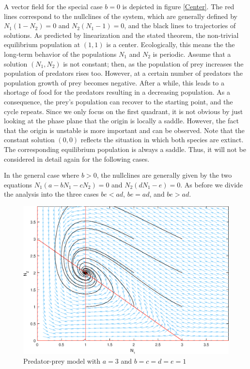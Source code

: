 \documentclass[11pt,a4paper]{scrartcl}
\theoremstyle{definition}
\begin{document}
A vector field for the special case $b=0$ is depicted in figure \ref{Center}. The red lines correspond to the nullclines of the system, which are generally defined by $N_1(1-N_2)=0$ and $N_2(N_1-1)=0$, and the black lines to trajectories of solutions. As predicted by linearization and the stated theorem, the non-trivial equilibrium population at $(1,1)$ is a center. Ecologically, this means the the long-term behavior of the populations $N_1$ and $N_2$ is periodic. Assume that a solution $(N_1,N_2)$ is not constant; then, as the population of prey increases the population of predators rises too. However, at a certain number of predators the population growth of prey becomes negative. After a while, this leads to a shortage of food for the predators resulting in a decreasing population. As a consequence, the prey's population can recover to the starting point, and the cycle repeats. Since we only focus on the first quadrant, it is not obvious by just looking at the phase plane that the origin is locally a saddle. However, the fact that the origin is unstable is more important and can be observed. Note that the constant solution $(0,0)$ reflects the situation in which both species are extinct. The corresponding equilibrium population is always a saddle. Thus, it will not be considered in detail again for the following cases. 
\newline

In the general case where $b>0$, the nullclines are generally given by the two equations $N_1(a-bN_1-cN_2)=0$ and $N_2(dN_1-e)=0$. As before we divide the analysis into the three cases $be<ad$, $be=ad$, and $be>ad$. 

\begin{figure}[h]
	\centering
	\includegraphics[scale=0.72]{nBeta_StableSpiral.eps}
	\caption{Predator-prey model with $a=3$ and $b=c=d=e=1$}
	\label{fig2}
\end{figure}
\FloatBarrier
\end{document}
